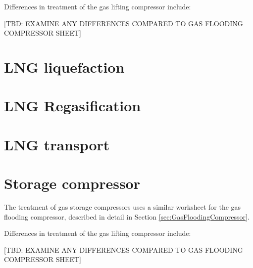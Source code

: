 \documentclass[11pt]{report}
\begin{document}
{Differences in treatment of the gas lifting compressor include:

[TBD: EXAMINE ANY DIFFERENCES COMPARED TO GAS FLOODING COMPRESSOR SHEET]






\clearpage

\section{LNG liquefaction}
\label{sec:lng_liquefaction}






\clearpage

\section{LNG Regasification}
\label{sec:lng_regassification}






\clearpage

\section{LNG transport}
\label{sec:lng_transport}









\clearpage

\section{Storage compressor}
\label{sec:storage_compressor}

The treatment of gas storage compressors uses a similar worksheet for the gas flooding compressor, described in detail in Section \ref{sec:GasFloodingCompressor}.

Differences in treatment of the gas lifting compressor include:

[TBD: EXAMINE ANY DIFFERENCES COMPARED TO GAS FLOODING COMPRESSOR SHEET]







\clearpage

}
\end{document}
